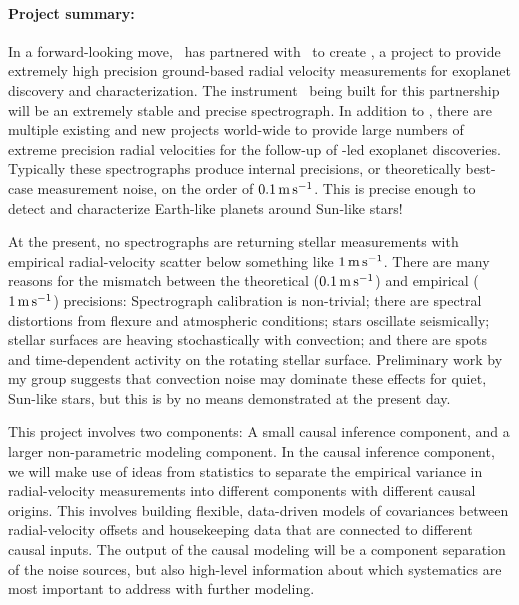 \documentclass[12pt, fullpage, letterpaper]{article}
\begin{document}
\paragraph{Project summary:}
In a forward-looking move, \NASA\ has partnered with \NSF\ to create
\NNEXPLORE, a project to provide extremely high precision ground-based
radial velocity measurements for exoplanet discovery and
characterization. The instrument \NEID\ being built for this
partnership will be an extremely stable and precise spectrograph. In
addition to \NEID, there are multiple existing and new projects
world-wide to provide large numbers of extreme precision radial
velocities for the follow-up of \NASA-led exoplanet
discoveries. Typically these spectrographs produce internal
precisions, or theoretically best-case measurement noise, on the order
of $0.1\,{\mathrm{m\,s^{-1}}}$. This is precise enough to detect and characterize
Earth-like planets around Sun-like stars!

At the present, no spectrographs are returning stellar measurements
with empirical radial-velocity scatter below something like $1\,{\mathrm{m\,s^{-1}}}$.
There are many reasons for the mismatch between the theoretical
($0.1\,{\mathrm{m\,s^{-1}}}$) and empirical ($1\,{\mathrm{m\,s^{-1}}}$) precisions: Spectrograph calibration
is non-trivial; there are spectral distortions from flexure and
atmospheric conditions; stars oscillate seismically; stellar surfaces
are heaving stochastically with convection; and there are spots and
time-dependent activity on the rotating stellar surface. Preliminary
work by my group suggests that convection noise may dominate these
effects for quiet, Sun-like stars, but this is by no means
demonstrated at the present day.

This project involves two components: A small causal inference
component, and a larger non-parametric modeling component. In the
causal inference component, we will make use of ideas from statistics
to separate the empirical variance in radial-velocity measurements
into different components with different causal origins. This involves
building flexible, data-driven models of covariances between
radial-velocity offsets and housekeeping data that are connected to
different causal inputs. The output of the causal modeling will be a
component separation of the noise sources, but also high-level
information about which systematics are most important to address with
further modeling.
\end{document}
